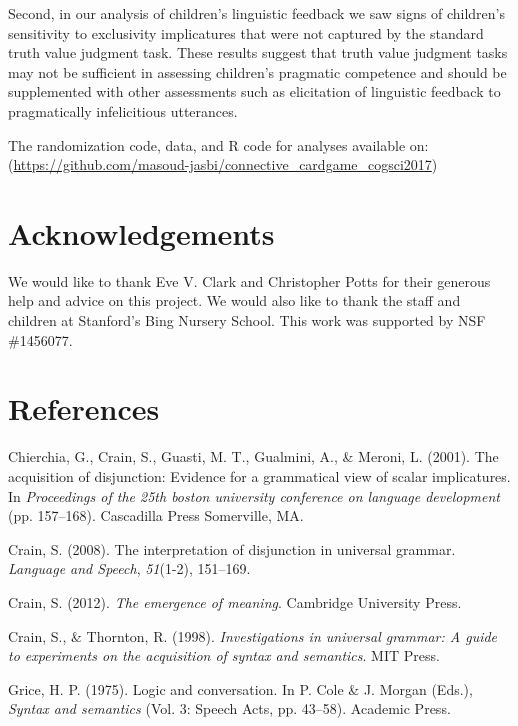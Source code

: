 \documentclass[10pt, letterpaper]{article}
\begin{document}
Second, in our analysis of children's linguistic feedback we saw signs
of children's sensitivity to exclusivity implicatures that were not
captured by the standard truth value judgment task. These results
suggest that truth value judgment tasks may not be sufficient in
assessing children's pragmatic competence and should be supplemented
with other assessments such as elicitation of linguistic feedback to
pragmatically infelicitious utterances.

The randomization code, data, and R code for analyses available on:
(\url{https://github.com/masoud-jasbi/connective_cardgame_cogsci2017})

\section{Acknowledgements}\label{acknowledgements}

We would like to thank Eve V. Clark and Christopher Potts for their
generous help and advice on this project. We would also like to thank
the staff and children at Stanford's Bing Nursery School. This work was
supported by NSF \#1456077.

\section{References}\label{references}

\setlength{\parindent}{-0.1in} \setlength{\leftskip}{0.125in} \noindent

\hypertarget{refs}{}
\hypertarget{ref-chierchia2001acquisition}{}
Chierchia, G., Crain, S., Guasti, M. T., Gualmini, A., \& Meroni, L.
(2001). The acquisition of disjunction: Evidence for a grammatical view
of scalar implicatures. In \emph{Proceedings of the 25th boston
university conference on language development} (pp. 157--168).
Cascadilla Press Somerville, MA.

\hypertarget{ref-crain2008interpretation}{}
Crain, S. (2008). The interpretation of disjunction in universal
grammar. \emph{Language and Speech}, \emph{51}(1-2), 151--169.

\hypertarget{ref-crain2012emergence}{}
Crain, S. (2012). \emph{The emergence of meaning}. Cambridge University
Press.

\hypertarget{ref-crain1998investigations}{}
Crain, S., \& Thornton, R. (1998). \emph{Investigations in universal
grammar: A guide to experiments on the acquisition of syntax and
semantics}. MIT Press.

\hypertarget{ref-grice1975logicconvo}{}
Grice, H. P. (1975). Logic and conversation. In P. Cole \& J. Morgan
(Eds.), \emph{Syntax and semantics} (Vol. 3: Speech Acts, pp. 43--58).
Academic Press.
\end{document}
